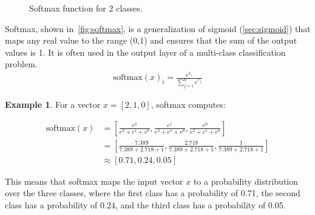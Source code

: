 \documentclass[oneside,11pt,dvipsnames]{book}
\numberwithin{equation}{section}
\theoremstyle{definition}
\newtheorem{example}{Example}[section]
\theoremstyle{remark}
\newcommand{\softmax}[1]{\mathrm{softmax}\left(#1\right)}
\begin{document}
\begin{figure}[htp]
    \centering
    \caption{Softmax function for 2 classes.}\label{fig:softmax}
\end{figure}


Softmax, shown in~\autoref{fig:softmax}, is a generalization of sigmoid (\autoref{sec:sigmoid}) that maps any real value to the range (0,1) and ensures that the sum of the output values is 1. It is often used in the output layer of a multi-class classification problem.
\begin{align}
\softmax{x}_i = \frac{e^{x_i}}{\sum_{j=1}^{n}e^{x_j}}
\end{align}

\begin{example}
For a vector $x = [2, 1, 0]$, softmax computes: 

{\small
\begin{align*}
\softmax{x} &= \left[\frac{e^2}{e^2+e^1+e^0}, \frac{e^1}{e^2+e^1+e^0}, \frac{e^0}{e^2+e^1+e^0}\right] \\
&= \left[\frac{7.389}{7.389+2.718+1}, \frac{2.718}{7.389+2.718+1}, \frac{1}{7.389+2.718+1}\right] \\
&\approx [0.71, 0.24, 0.05]
\end{align*}
}

This means that softmax maps the input vector $x$ to a probability distribution over the three classes, where the first class has a probability of 0.71, the second class has a probability of 0.24, and the third class has a probability of 0.05.
\end{example}
\end{document}
